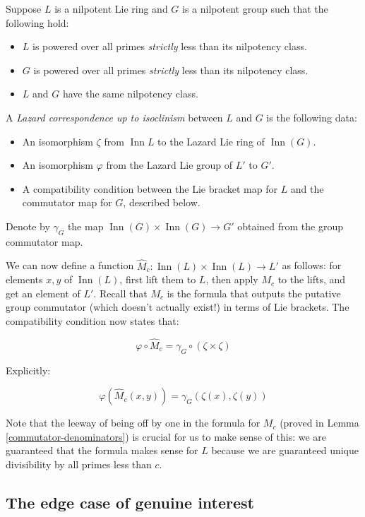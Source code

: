 Suppose $L$ is a nilpotent Lie ring and $G$ is a nilpotent group such
that the following hold:

\begin{itemize}
\item $L$ is powered over all primes {\em strictly} less than its
  nilpotency class.
\item $G$ is powered over all primes {\em strictly} less than its
  nilpotency class.
\item $L$ and $G$ have the same nilpotency class.
\end{itemize}
  
A {\em Lazard correspondence up to isoclinism} between $L$ and $G$ is
the following data:

\begin{itemize}
\item An isomorphism $\zeta$ from $\operatorname{Inn}L$ to the Lazard
  Lie ring of $\operatorname{Inn}(G)$.
\item An isomorphism $\varphi$ from the Lazard Lie group of $L'$ to
  $G'$.
\item A compatibility condition between the Lie bracket map for $L$
  and the commutator map for $G$, described below.
\end{itemize}

Denote by $\gamma_G$ the map $\operatorname{Inn}(G) \times
\operatorname{Inn}(G) \to G'$ obtained from the group commutator map.

We can now define a function $\hat{M}_c:\operatorname{Inn}(L) \times
\operatorname{Inn}(L) \to L'$ as follows: for elements $x,y$ of
$\operatorname{Inn}(L)$, first lift them to $L$, then apply $M_c$ to
the lifts, and get an element of $L'$. Recall that $M_c$ is the
formula that outputs the putative group commutator (which doesn't
actually exist!) in terms of Lie brackets. The compatibility condition
now states that:

$$\varphi \circ \hat{M}_c = \gamma_G \circ (\zeta \times \zeta)$$

Explicitly:

$$\varphi(\hat{M}_c(x,y)) = \gamma_G(\zeta(x),\zeta(y))$$

Note that the leeway of being off by one in the formula for $M_c$
(proved in Lemma \ref{commutator-denominators}) is crucial for us to
make sense of this: we are guaranteed that the formula makes sense for
$L$ because we are guaranteed unique divisibility by all primes less
than $c$.

\subsection*{The edge case of genuine interest}

